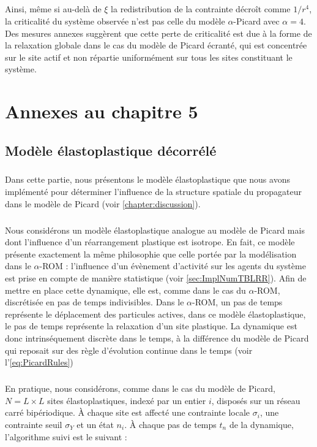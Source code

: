 \subparagraph{}Ainsi, même si au-delà de $\xi$ la redistribution de la contrainte décroît comme $1/r^4$, la criticalité du système observée n'est pas celle du modèle $\alpha$-Picard avec $\alpha = 4$. Des mesures annexes suggèrent que cette perte de criticalité est due à la forme de la relaxation globale dans le cas du modèle de Picard écranté, qui est concentrée sur le site actif et non répartie uniformément sur tous les sites constituant le système.

\section{Annexes au chapitre 5}

\subsection{Modèle élastoplastique décorrélé}

\label{sec:EPMdiscret}

\subparagraph{}Dans cette partie, nous présentons le modèle élastoplastique que nous avons implémenté pour déterminer l'influence de la structure spatiale du propagateur dans le modèle de Picard (voir \autoref{chapter:discussion}).

\subparagraph{}Nous considérons un modèle élastoplastique analogue au modèle de Picard mais dont l'influence d'un réarrangement plastique est isotrope. En fait, ce modèle présente exactement la même philosophie que celle portée par la modélisation dans le $\alpha$-ROM : l'influence d'un évènement d'activité sur les agents du système est prise en compte de manière statistique (voir \autoref{sec:ImplNumTBLRR}). Afin de mettre en place cette dynamique, elle est, comme dans le cas du $\alpha$-ROM, discrétisée en pas de temps indivisibles. Dans le $\alpha$-ROM, un pas de temps représente le déplacement des particules actives, dans ce modèle élastoplastique, le pas de temps représente la relaxation d'un site plastique. La dynamique est donc intrinséquement discrète dans le temps, à la différence du modèle de Picard qui reposait sur des règle d'évolution continue dans le temps (voir l'\autoref{eq:PicardRules})

\subparagraph{}En pratique, nous considérons, comme dans le cas du modèle de Picard, $N = L\times L$ sites élastoplastiques, indexé par un entier $i$, disposés sur un réseau carré bipériodique. \`A chaque site est affecté une contrainte locale $\sigma_i$, une contrainte seuil $\sigma_Y$ et un état $n_i$. \`A chaque pas de temps $t_n$ de la dynamique, l'algorithme suivi est le suivant :

